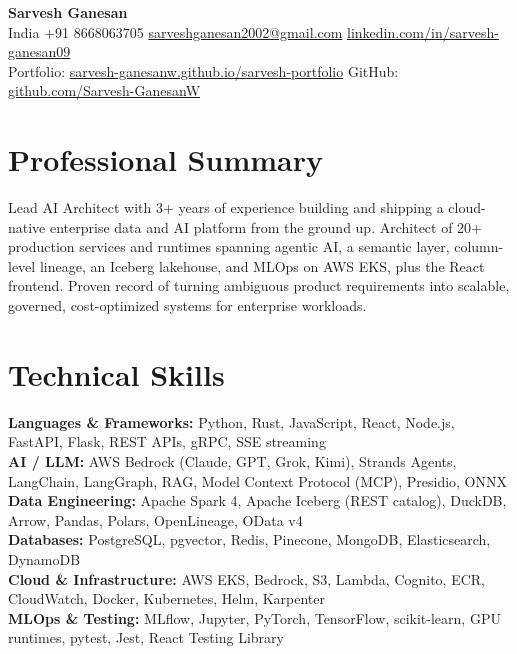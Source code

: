 \documentclass[10pt,letterpaper]{article}
\begin{document}
\begin{center}
{\Huge \textbf{Sarvesh Ganesan}}\\[2pt]
India \textbar{} +91 8668063705 \textbar{} \href{mailto:sarveshganesan2002@gmail.com}{sarveshganesan2002@gmail.com} \textbar{}
\href{https://linkedin.com/in/sarvesh-ganesan09}{linkedin.com/in/sarvesh-ganesan09}\\
Portfolio: \href{https://sarvesh-ganesanw.github.io/sarvesh-portfolio/}{sarvesh-ganesanw.github.io/sarvesh-portfolio} \textbar{}
GitHub: \href{https://github.com/Sarvesh-GanesanW}{github.com/Sarvesh-GanesanW}
\end{center}

\small

\section*{Professional Summary}
Lead AI Architect with 3+ years of experience building and shipping a cloud-native enterprise data and AI platform from the ground up. Architect of 20+ production services and runtimes spanning agentic AI, a semantic layer, column-level lineage, an Iceberg lakehouse, and MLOps on AWS EKS, plus the React frontend. Proven record of turning ambiguous product requirements into scalable, governed, cost-optimized systems for enterprise workloads.

\section*{Technical Skills}
\textbf{Languages \& Frameworks:} Python, Rust, JavaScript, React, Node.js, FastAPI, Flask, REST APIs, gRPC, SSE streaming\\
\textbf{AI / LLM:} AWS Bedrock (Claude, GPT, Grok, Kimi), Strands Agents, LangChain, LangGraph, RAG, Model Context Protocol (MCP), Presidio, ONNX\\
\textbf{Data Engineering:} Apache Spark 4, Apache Iceberg (REST catalog), DuckDB, Arrow, Pandas, Polars, OpenLineage, OData v4\\
\textbf{Databases:} PostgreSQL, pgvector, Redis, Pinecone, MongoDB, Elasticsearch, DynamoDB\\
\textbf{Cloud \& Infrastructure:} AWS EKS, Bedrock, S3, Lambda, Cognito, ECR, CloudWatch, Docker, Kubernetes, Helm, Karpenter\\
\textbf{MLOps \& Testing:} MLflow, Jupyter, PyTorch, TensorFlow, scikit-learn, GPU runtimes, pytest, Jest, React Testing Library
\end{document}
